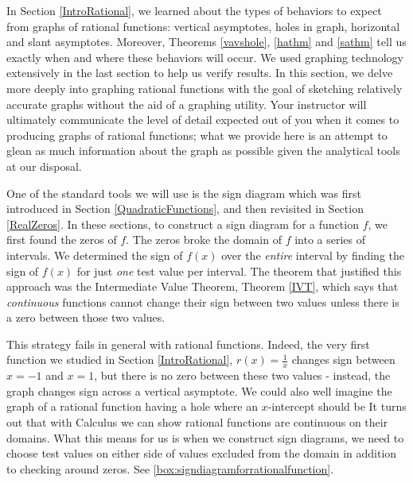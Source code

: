 
\setcounter{footnote}{0}

\label{RationalGraphs}

In Section \ref{IntroRational}, we learned about the types of behaviors to expect from graphs of rational functions: vertical asymptotes, holes in graph, horizontal and slant asymptotes.   Moreover,  Theorems \ref{vavshole}, \ref{hathm} and \ref{sathm} tell us exactly when and where these behaviors will occur.  We used graphing technology extensively in the last section to help us verify results. In this section, we delve more deeply into graphing rational functions with the goal of sketching relatively accurate graphs without the aid of a graphing utility.  Your instructor will ultimately communicate the level of detail expected out of you when it comes to producing graphs of rational functions;  what we provide here is an attempt to glean as much information about the graph as possible given the analytical tools at our disposal.  

One of the standard tools we will use is the sign diagram which was first introduced in Section \ref{QuadraticFunctions}, and then revisited in Section \ref{RealZeros}. In these sections,  to construct a sign diagram for a function $f$, we first found the zeros of $f$.  The zeros broke  the domain of $f$ into a series of intervals.  We determined the sign of $f(x)$ over the \textit{entire} interval by finding the sign of $f(x)$ for just \textit{one} test value per interval.  The theorem that justified this approach was the Intermediate Value Theorem, Theorem \ref{IVT}, which says that \textit{continuous} functions cannot change their sign between two values unless there is a zero  between those two values. 

This strategy fails in  general with rational functions.  Indeed, the very first  function we studied in Section \ref{IntroRational}, $r(x) = \frac{1}{x}$ changes sign between $x=-1$ and $x=1$, but there is no zero between these two values - instead, the graph changes sign across a vertical asymptote.  We could also well imagine the graph of a rational function having a hole where an $x$-intercept should be  It turns out that with Calculus we can show rational functions are continuous on their domains.  What this means for us is when we construct sign diagrams, we need to choose test values on either side of values excluded from the domain in addition to checking around zeros.
See \autoref{box:signdiagramforrationalfunction}.

